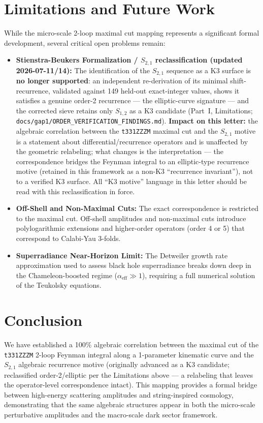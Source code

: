 \documentclass[11pt,a4paper]{article}
\begin{document}
\section{Limitations and Future Work}
While the micro-scale 2-loop maximal cut mapping represents a significant formal development, several critical open problems remain:
\begin{itemize}
    \item \textbf{Stienstra-Beukers Formalization / $S_{2,1}$ reclassification (updated 2026-07-11/14):} The identification of the $S_{2,1}$ sequence as a K3 surface is \textbf{no longer supported}: an independent re-derivation of its minimal shift-recurrence, validated against 149 held-out exact-integer values, shows it satisfies a genuine order-2 recurrence — the elliptic-curve signature — and the corrected sieve retains only $S_{1,2}$ as a K3 candidate (Part~I, Limitations; \texttt{docs/gap1/ORDER\_VERIFICATION\_FINDINGS.md}). \textbf{Impact on this letter:} the algebraic correlation between the \texttt{t331ZZZM} maximal cut and the $S_{2,1}$ motive is a statement about differential/recurrence operators and is unaffected by the geometric relabeling; what changes is the interpretation — the correspondence bridges the Feynman integral to an elliptic-type recurrence motive (retained in this framework as a non-K3 ``recurrence invariant''), not to a verified K3 surface. All ``K3 motive'' language in this letter should be read with this reclassification in force.
    \item \textbf{Off-Shell and Non-Maximal Cuts:} The exact correspondence is restricted to the maximal cut. Off-shell amplitudes and non-maximal cuts introduce polylogarithmic extensions and higher-order operators (order 4 or 5) that correspond to Calabi-Yau 3-folds.
    \item \textbf{Superradiance Near-Horizon Limit:} The Detweiler growth rate approximation used to assess black hole superradiance breaks down deep in the Chameleon-boosted regime ($\alpha_{\text{eff}} \gg 1$), requiring a full numerical solution of the Teukolsky equations.
\end{itemize}

\section{Conclusion}
We have established a 100\% algebraic correlation between the maximal cut of the \texttt{t331ZZZM} 2-loop Feynman integral along a 1-parameter kinematic curve and the $S_{2,1}$ algebraic recurrence motive (originally advanced as a K3 candidate; reclassified order-2/elliptic per the Limitations above — a relabeling that leaves the operator-level correspondence intact). This mapping provides a formal bridge between high-energy scattering amplitudes and string-inspired cosmology, demonstrating that the same algebraic structures appear in both the micro-scale perturbative amplitudes and the macro-scale dark sector framework.

\vspace{1em}



\end{document}
